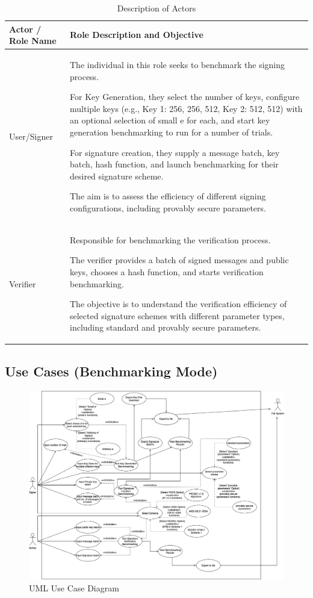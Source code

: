 \documentclass[]{final_report}
\theoremstyle{definition}
\begin{document}
\begin{table}[H]
    \centering
    \caption{Description of Actors}
    \label{tab:actors_description}
    \begin{tabular}{|l|p{10cm}|}
    \hline
    \textbf{Actor / Role Name} & \textbf{Role Description and Objective} \\
    \hline
        User/Signer & The individual in this role seeks to benchmark the signing process. 
        
        For Key Generation, they select the number of keys,  configure multiple keys (e.g., Key 1: 256, 256, 512,  Key 2: 512, 512) with an optional selection of small e for each, and start key generation benchmarking to run for a number of trials. 
        
        For signature creation, they supply a message batch, key batch, hash function, and launch benchmarking for their desired signature scheme. 
        
        The aim is to assess the efficiency of different signing configurations, including provably secure parameters. \\
    \hline
       Verifier & Responsible for benchmarking the verification process. 
       
       The verifier provides a batch of signed messages and public keys, chooses a hash function, and starts verification benchmarking. 
       
       The objective is to understand the verification efficiency of selected signature schemes with different parameter types, including standard and provably secure parameters.  \\
    \hline
    \end{tabular}
\end{table}




\subsection{Use Cases (Benchmarking Mode)}
\begin{figure}[H]
    \centering
    \includegraphics[scale=0.4]{main_pictures/MAIN_USE-CASE.png}
    \caption{UML Use Case Diagram}
    \label{fig:uc}
\end{figure}
\end{document}

